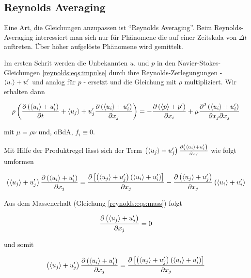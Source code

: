 \subsection{Reynolds Averaging}
Eine Art, die Gleichungen anzupassen ist ``Reynolds Averaging''. Beim Reynolds-Averaging
interessiert man sich nur für Phänomene die auf einer Zeitskala von $\Delta t$ auftreten.
Über höher aufgelöste Phänomene wird gemittelt.

Im ersten Schrit werden die Unbekannten $u_\cdot$ und $p$ in den Navier-Stokes-Gleichungen \ref{reynolds:eqs:impulse}
durch ihre Reynolds-Zerlegungungen - $\langle u_\cdot \rangle + u_\cdot'$ und analog für $p$ - ersetzt und die Gleichung
mit $\rho$ multipliziert. Wir erhalten dann

\begin{equation}
    \label{reynolds:eqs:der1}
    \rho \left( \frac{\partial \left( \langle u_i \rangle + u_i' \right)}{\partial t} + \langle u_j \rangle + u_j' \frac{\partial \left( \langle u_i \rangle + u_i' \right)}{\partial x_j} \right) =
        - \frac{\partial \left( \langle p \rangle + p' \right)}{\partial x_i} + 
        \mu \frac{\partial^2 \left( \langle u_i \rangle + u_i' \right)}{\partial x_j \partial x_j}
\end{equation}

mit $\mu = \rho \nu$ und, oBdA, $f_i \equiv 0$.

Mit Hilfe der Produktregel lässt sich der Term $\left( \langle u_j \rangle + u_j' \right) \frac{\partial \left( \langle u_i \rangle + u_i' \right)}{\partial x_j}$
wie folgt umformen

\begin{equation}
    \left( \langle u_j \rangle + u_j' \right) \frac{\partial \left( \langle u_i \rangle + u_i' \right)}{\partial x_j} =
        \frac{\partial \left[ \left( \langle u_j \rangle + u_j' \right) \left( \langle u_i \rangle + u_i' \right) \right]}{\partial x_j}
        - \frac{\partial \left( \langle u_j \rangle + u_j' \right)}{\partial x_j} \left( \langle u_i \rangle + u_i' \right)
\end{equation}

Aus dem Massenerhalt (Gleichung \ref{reynolds:eqs:mass}) folgt

\begin{equation}
    \frac{\partial \left( \langle u_j \rangle + u_j' \right)}{\partial x_j} = 0
\end{equation}

und somit

\begin{equation}
    \label{reynolds:eqs:der2}
    \left( \langle u_j \rangle + u_j' \right) \frac{\partial \left( \langle u_i \rangle + u_i' \right)}{\partial x_j} =
        \frac{\partial \left[ \left( \langle u_j \rangle + u_j' \right) \left( \langle u_i \rangle + u_i' \right) \right]}{\partial x_j}
\end{equation}

